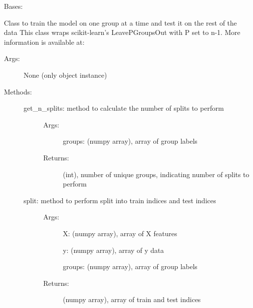 \documentclass[letterpaper,10pt,english]{sphinxmanual}
\begin{document}
\begin{fulllineitems}
\label{\detokenize{api/mastml.data_splitters.JustEachGroup:mastml.data_splitters.JustEachGroup}}
Bases: {\hyperref[\detokenize{api/mastml.data_splitters.BaseSplitter:mastml.data_splitters.BaseSplitter}]{}}

Class to train the model on one group at a time and test it on the rest of the data
This class wraps scikit-learn’s LeavePGroupsOut with P set to n-1. More information is available at:
\begin{description}
\item[{Args:}] \leavevmode
None (only object instance)

\item[{Methods:}] \leavevmode\begin{description}
\item[{get\_n\_splits: method to calculate the number of splits to perform}] \leavevmode\begin{description}
\item[{Args:}] \leavevmode
groups: (numpy array), array of group labels

\item[{Returns:}] \leavevmode
(int), number of unique groups, indicating number of splits to perform

\end{description}

\item[{split: method to perform split into train indices and test indices}] \leavevmode\begin{description}
\item[{Args:}] \leavevmode
X: (numpy array), array of X features

y: (numpy array), array of y data

groups: (numpy array), array of group labels

\item[{Returns:}] \leavevmode
(numpy array), array of train and test indices

\end{description}

\end{description}


\end{description}
\end{fulllineitems}
\end{document}
